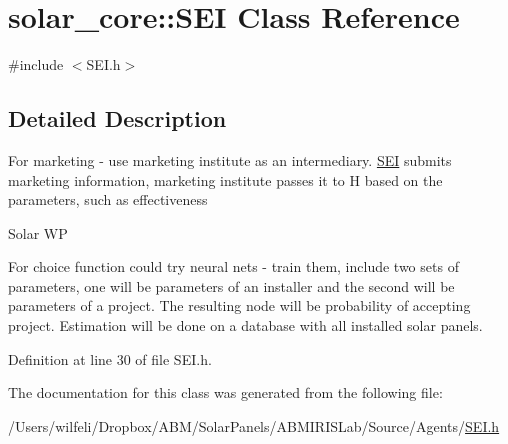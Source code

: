 \hypertarget{classsolar__core_1_1_s_e_i}{}\section{solar\+\_\+core\+:\+:S\+E\+I Class Reference}
\label{classsolar__core_1_1_s_e_i}


{\ttfamily \#include $<$S\+E\+I.\+h$>$}



\subsection{Detailed Description}
For marketing -\/ use marketing institute as an intermediary. \hyperlink{classsolar__core_1_1_s_e_i}{S\+E\+I} submits marketing information, marketing institute passes it to H based on the parameters, such as effectiveness

\begin{DoxyRefDesc}{Solar W\+P}
\item[\hyperlink{wp__wp000001}{Solar W\+P}]For choice function could try neural nets -\/ train them, include two sets of parameters, one will be parameters of an installer and the second will be parameters of a project. The resulting node will be probability of accepting project. Estimation will be done on a database with all installed solar panels.\end{DoxyRefDesc}


Definition at line 30 of file S\+E\+I.\+h.



The documentation for this class was generated from the following file\+:\begin{DoxyCompactItemize}
\item 
/\+Users/wilfeli/\+Dropbox/\+A\+B\+M/\+Solar\+Panels/\+A\+B\+M\+I\+R\+I\+S\+Lab/\+Source/\+Agents/\hyperlink{_s_e_i_8h}{S\+E\+I.\+h}\end{DoxyCompactItemize}
